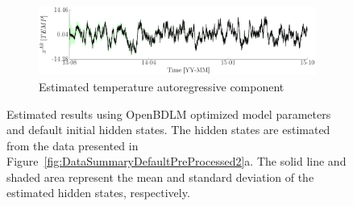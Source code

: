 \begin{figure}[h!]
\begin{subfigure}{\linewidth}
\end{subfigure}
\begin{subfigure}{\linewidth}
\includegraphics[width=0.9\linewidth]{./docfigs/Example_DISPTEMPSIM/optim_param_default_initialhiddenstate/TEMP_AR_6.pdf} 
\caption{Estimated temperature autoregressive component}
\end{subfigure}
\caption{Estimated results using OpenBDLM optimized model parameters and default initial hidden states. The hidden states are estimated from the data presented in Figure~\ref{fig:DataSummaryDefaultPreProcessed2}a. The solid line and shaded area represent the mean and standard deviation of the estimated hidden states, respectively.}
\label{fig:DISPTEMPSIMOptimizedDefaultExample2}
\end{figure}

